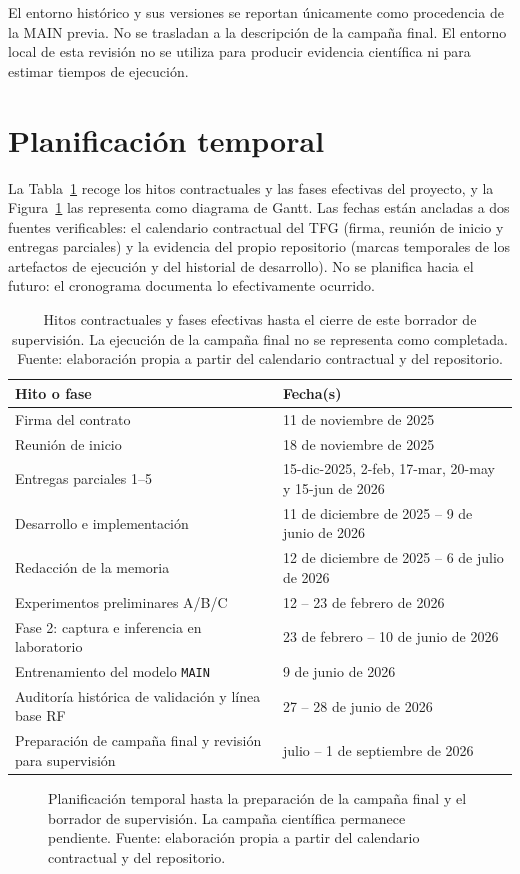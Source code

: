 El entorno histórico y sus versiones se reportan únicamente como procedencia de la MAIN previa. No se trasladan a la descripción de la campaña final. El entorno local de esta revisión no se utiliza para producir evidencia científica ni para estimar tiempos de ejecución.

\section{Planificación temporal}
La Tabla~\ref{tab:hitos} recoge los hitos contractuales y las fases efectivas del proyecto, y la Figura~\ref{fig:gantt} las representa como diagrama de Gantt. Las fechas están ancladas a dos fuentes verificables: el calendario contractual del TFG (firma, reunión de inicio y entregas parciales) y la evidencia del propio repositorio (marcas temporales de los artefactos de ejecución y del historial de desarrollo). No se planifica hacia el futuro: el cronograma documenta lo efectivamente ocurrido.

\begin{table}[htbp]
\centering
\small
\begin{tabular}{p{7.2cm}p{5.4cm}}
\toprule
Hito o fase & Fecha(s) \\
\midrule
Firma del contrato & 11 de noviembre de 2025 \\
Reunión de inicio & 18 de noviembre de 2025 \\
Entregas parciales 1--5 & 15-dic-2025, 2-feb, 17-mar, 20-may y 15-jun de 2026 \\
Desarrollo e implementación & 11 de diciembre de 2025 -- 9 de junio de 2026 \\
Redacción de la memoria & 12 de diciembre de 2025 -- 6 de julio de 2026 \\
Experimentos preliminares A/B/C & 12 -- 23 de febrero de 2026 \\
Fase 2: captura e inferencia en laboratorio & 23 de febrero -- 10 de junio de 2026 \\
Entrenamiento del modelo \texttt{MAIN} & 9 de junio de 2026 \\
Auditoría histórica de validación y línea base RF & 27 -- 28 de junio de 2026 \\
Preparación de campaña final y revisión para supervisión & julio -- 1 de septiembre de 2026 \\
\bottomrule
\end{tabular}
\caption[Hitos y fases del proyecto]{Hitos contractuales y fases efectivas hasta el cierre de este borrador de supervisión. La ejecución de la campaña final no se representa como completada. Fuente: elaboración propia a partir del calendario contractual y del repositorio.}
\label{tab:hitos}
\end{table}

\begin{figure}[htbp]
\centering
\resizebox{\textwidth}{!}{}
\caption[Diagrama de Gantt del proyecto]{Planificación temporal hasta la preparación de la campaña final y el borrador de supervisión. La campaña científica permanece pendiente. Fuente: elaboración propia a partir del calendario contractual y del repositorio.}
\label{fig:gantt}
\end{figure}
